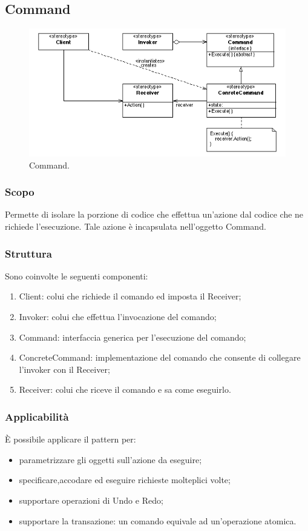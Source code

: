 \subsection{Command}

\begin{figure}[H] \label{fig:command}
	\includegraphics[scale=0.6]{img/command.png}
	\caption{Command.}
\end{figure}

\subsubsection{Scopo} Permette di isolare la porzione di codice che effettua un'azione dal codice che ne richiede l'esecuzione. Tale azione è incapsulata nell'oggetto Command.

\subsubsection{Struttura} Sono coinvolte le seguenti componenti:
\begin{enumerate}
	\item Client: colui che richiede il comando  ed imposta il Receiver;
	\item Invoker: colui che effettua l'invocazione del comando;
	\item Command: interfaccia generica per l'esecuzione del comando;
	\item ConcreteCommand: implementazione del comando che consente di collegare l'invoker con il Receiver;
	\item Receiver: colui che riceve il comando e sa come eseguirlo.
\end{enumerate}

\subsubsection{Applicabilità} È possibile applicare il pattern per:
\begin{itemize}
	\item parametrizzare gli oggetti sull'azione da eseguire;
	\item specificare,accodare ed eseguire richieste molteplici volte;
	\item supportare operazioni di Undo e Redo;
	\item supportare la transazione: un comando equivale ad un'operazione atomica.
\end{itemize}
